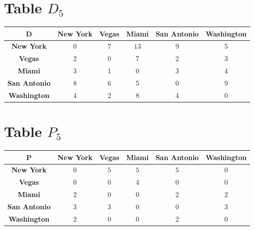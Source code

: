 \documentclass{article}
\begin{document}
\section{Table $D_{5}$}
\begin{center}
    \begin{tabular}{|c||c|c|c|c|c|}
        \hline
        \textbf{D} & \textbf{New York} & \textbf{Vegas} & \textbf{Miami} & \textbf{San Antonio} & \textbf{Washington} \\
        \hline
        \hline
        \textbf{New York}& 0 & \cellcolor[HTML]{D74894}$7$ & \cellcolor[HTML]{D74894}$13$ & \cellcolor[HTML]{D74894}$9$ & 5 \\
        \hline
        \textbf{Vegas}& 2 & 0 & 7 & 2 & 3 \\
        \hline
        \textbf{Miami}& 3 & 1 & 0 & 3 & 4 \\
        \hline
        \textbf{San Antonio}& 8 & 6 & 5 & 0 & 9 \\
        \hline
        \textbf{Washington}& 4 & 2 & 8 & 4 & 0 \\
        \hline
    \end{tabular}
\end{center}


\section{Table $P_{5}$}
\begin{center}
    \begin{tabular}{|c||c|c|c|c|c|}
        \hline
        \textbf{P} & \textbf{New York} & \textbf{Vegas} & \textbf{Miami} & \textbf{San Antonio} & \textbf{Washington} \\
        \hline
        \hline
        \textbf{New York}& 0 & \cellcolor[HTML]{D74894}$5$ & \cellcolor[HTML]{D74894}$5$ & \cellcolor[HTML]{D74894}$5$ & 0 \\
        \hline
        \textbf{Vegas}& 0 & 0 & 4 & 0 & 0 \\
        \hline
        \textbf{Miami}& 2 & 0 & 0 & 2 & 2 \\
        \hline
        \textbf{San Antonio}& 3 & 3 & 0 & 0 & 3 \\
        \hline
        \textbf{Washington}& 2 & 0 & 0 & 2 & 0 \\
        \hline
    \end{tabular}
\end{center}
\end{document}
